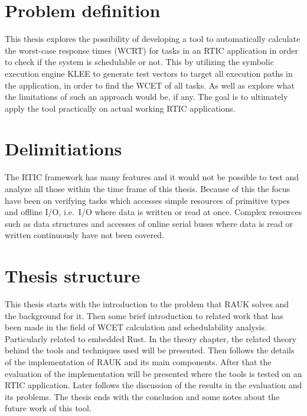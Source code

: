 \section{Problem definition}
This thesis explores the possibility of developing a tool to automatically
calculate the worst-case response times (WCRT) for tasks in an RTIC
application in order to check if the system is schedulable or not. This by
utilizing the symbolic execution engine KLEE to generate test vectors to target
all execution paths in the application, in order to find the WCET of all tasks.
As well as explore what the limitations of such an approach would be, if any.
The goal is to ultimately apply the tool practically on actual working RTIC
applications.

\section{Delimitiations}
The RTIC framework has many features and it would not be possible to test and
analyze all those within the time frame of this thesis. Because of this the
focus have been on verifying tasks which accesses simple resources of primitive
types and offline I/O, i.e.\ I/O where data is written or read at once. Complex
resources such as data structures and accesses of online serial buses where
data is read or written continuously have not been covered.

\section{Thesis structure}
This thesis starts with the introduction to the problem that RAUK solves and
the background for it. Then some brief introduction to related work that has
been made in the field of WCET calculation and schedulability analysis.
Particularly related to embedded Rust. In the theory chapter, the related
theory behind the tools and techniques used will be presented. Then follows
the details of the implementation of RAUK and its main components. After that
the evaluation of the implementation will be presented where the tools is
tested on an RTIC application. Later follows the discussion of the results
in the evaluation and its problems. The thesis ends with the conclusion and
some notes about the future work of this tool.
